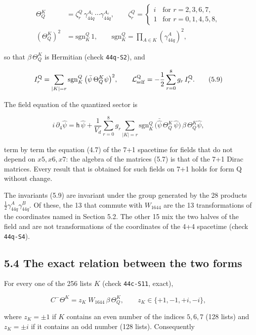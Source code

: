 \documentclass[
  10pt,
]{article}
\begin{document}
\[\begin{aligned}
\Theta_Q^K&=\zeta^Q_r\,\gamma_{44q}^{A_1}\cdots\gamma_{44q}^{A_r},\qquad
\zeta^Q_r=\begin{cases}i&\text{for }r=2,3,6,7,\\1&\text{for }r=0,1,4,5,8,\end{cases}\\
(\Theta_Q^K)^2&=\mathrm{sgn}^Q_K\,1,\qquad\mathrm{sgn}^Q_K=\prod_{A\in K}(\gamma_{44q}^A)^2,
\end{aligned}\tag{5.8}\]

so that \(\beta\,\Theta_Q^K\) is Hermitian (check \texttt{44q-S2}), and

\[I_r^{\rm Q}=\sum_{|K|=r}\mathrm{sgn}^Q_K\,\big(\bar\psi\,\Theta_Q^K\psi\big)^2,\qquad
\mathcal L_{\rm self}^{\rm Q}=-\frac12\sum_{r=0}^{8}g_r\,I_r^{\rm Q}.\tag{5.9}\]

The field equation of the quantized sector is

\[i\,\partial_4\hat\psi=\mathsf h\,\hat\psi+\frac1{V_d}\sum_{r=0}^{8}g_r\sum_{|K|=r}\mathrm{sgn}^Q_K\,\big(\bar{\hat\psi}\,\Theta_Q^K\,\hat\psi\big)\,\beta\,\Theta_Q^K\hat\psi,\tag{5.10}\]

term by term the equation (4.7) of the 7+1 spacetime for fields that do
not depend on \(x5,x6,x7\): the algebra of the matrices (5.7) is that of
the 7+1 Dirac matrices. Every result that is obtained for such fields on
7+1 holds for form Q without change.

The invariants (5.9) are invariant under the group generated by the 28
products \(\tfrac12\gamma_{44q}^A\gamma_{44q}^B\). Of these, the 13 that
commute with \(W_{1644}\) are the 13 transformations of the coordinates
named in Section 5.2. The other 15 mix the two halves of the field and
are not transformations of the coordinates of the 4+4 spacetime (check
\texttt{44q-S4}).

\hypertarget{the-exact-relation-between-the-two-forms}{%
\subsection{5.4 The exact relation between the two
forms}\label{the-exact-relation-between-the-two-forms}}

For every one of the 256 lists \(K\) (check \texttt{44c-S11}, exact),

\[C^-\Theta^K=z_K\;W_{1644}\,\beta\,\Theta_Q^K,\qquad z_K\in\{+1,-1,+i,-i\},\tag{5.11}\]

where \(z_K=\pm1\) if \(K\) contains an even number of the indices
\(5,6,7\) (128 lists) and \(z_K=\pm i\) if it contains an odd number
(128 lists). Consequently
\end{document}
